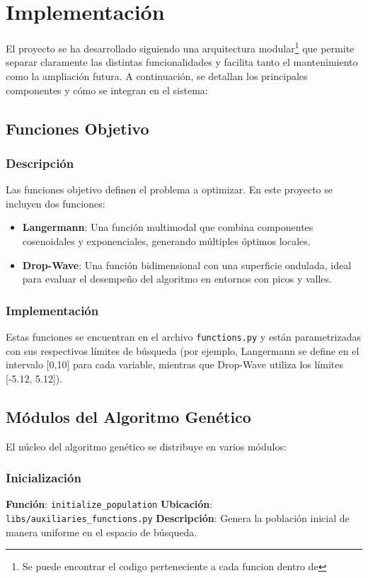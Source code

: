 \chapter{Implementaci\'on}

El proyecto se ha desarrollado siguiendo una arquitectura modular\footnote{Se puede encontrar el codigo perteneciente a cada funcion dentro de} que permite separar claramente las distintas funcionalidades y facilita tanto el mantenimiento como la ampliaci\'on futura. A continuaci\'on, se detallan los principales componentes y c\'omo se integran en el sistema:

\section{Funciones Objetivo}

\subsection{Descripci\'on}
Las funciones objetivo definen el problema a optimizar. En este proyecto se incluyen dos funciones:
\begin{itemize}
    \item \textbf{Langermann}: Una funci\'on multimodal que combina componentes cosenoidales y exponenciales, generando m\'ultiples \'optimos locales.
    \item \textbf{Drop-Wave}: Una funci\'on bidimensional con una superficie ondulada, ideal para evaluar el desempe\~no del algoritmo en entornos con picos y valles.
\end{itemize}

\subsection{Implementaci\'on}
Estas funciones se encuentran en el archivo \texttt{functions.py} y est\'an parametrizadas con sus respectivos l\'imites de b\'usqueda (por ejemplo, Langermann se define en el intervalo [0,10] para cada variable, mientras que Drop-Wave utiliza los l\'imites [-5.12, 5.12]).

\section{M\'odulos del Algoritmo Gen\'etico}

El n\'ucleo del algoritmo gen\'etico se distribuye en varios m\'odulos:

\subsection{Inicializaci\'on}
\textbf{Funci\'on}: \texttt{initialize\_population}  
\textbf{Ubicaci\'on}: \texttt{libs/auxiliaries\_functions.py}  
\textbf{Descripci\'on}: Genera la poblaci\'on inicial de manera uniforme en el espacio de b\'usqueda.

